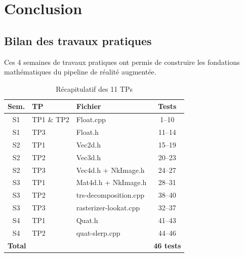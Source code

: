 \documentclass[12pt,a4paper]{report}
\begin{document}
\newpage

\chapter*{Conclusion }

\section*{Bilan des travaux pratiques}

Ces 4 semaines de travaux pratiques ont permis de construire les
fondations mathématiques du pipeline de réalité augmentée.

\begin{table}[H]
    \centering
    \begin{tabular}{|c|l|l|c|}
        \hline
        \textbf{Sem.} & \textbf{TP} & \textbf{Fichier} &
        \textbf{Tests} \\
        \hline
        S1 & TP1 \& TP2 & Float.cpp & 1--10 \\
        S1 & TP3        & Float.h   & 11--14 \\
        \hline
        S2 & TP1 & Vec2d.h & 15--19 \\
        S2 & TP2 & Vec3d.h & 20--23 \\
        S2 & TP3 & Vec4d.h + NkImage.h & 24--27 \\
        \hline
        S3 & TP1 & Mat4d.h + NkImage.h & 28--31 \\
        S3 & TP2 & trs-decomposition.cpp & 38--40 \\
        S3 & TP3 & rasterizer-lookat.cpp & 32--37 \\
        \hline
        S4 & TP1 & Quat.h & 41--43 \\
        S4 & TP2 & quat-slerp.cpp & 44--46 \\
        \hline
        \multicolumn{3}{|l|}{\textbf{Total}} & \textbf{46 tests} \\
        \hline
    \end{tabular}
    \caption{Récapitulatif des 11 TPs}
\end{table}
\end{document}
